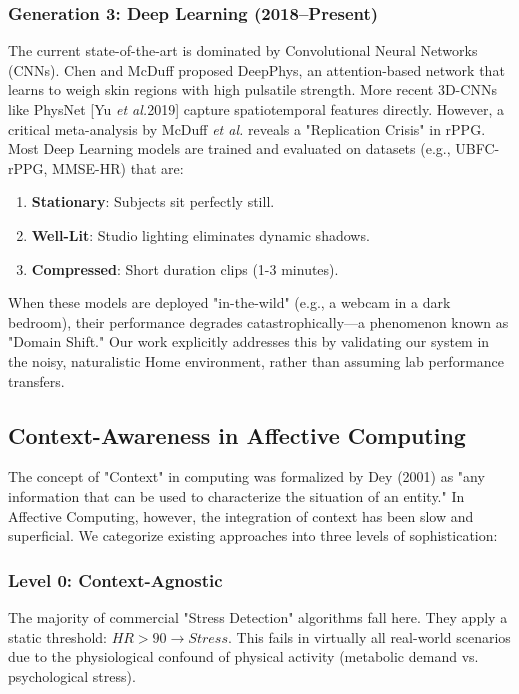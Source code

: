\documentclass[journal]{IEEEtran}
\newcommand{\etal}{\textit{et al.}}
\begin{document}
\subsubsection{Generation 3: Deep Learning (2018--Present)}
The current state-of-the-art is dominated by Convolutional Neural Networks (CNNs). Chen and McDuff \cite{deepphys} proposed DeepPhys, an attention-based network that learns to weigh skin regions with high pulsatile strength. More recent 3D-CNNs like PhysNet [Yu \etal 2019] capture spatiotemporal features directly.
However, a critical meta-analysis by McDuff \etal \cite{mcduff_rppg} reveals a "Replication Crisis" in rPPG. Most Deep Learning models are trained and evaluated on datasets (e.g., UBFC-rPPG, MMSE-HR) that are:
\begin{enumerate}
    \item \textbf{Stationary}: Subjects sit perfectly still.
    \item \textbf{Well-Lit}: Studio lighting eliminates dynamic shadows.
    \item \textbf{Compressed}: Short duration clips (1-3 minutes).
\end{enumerate}
When these models are deployed "in-the-wild" (e.g., a webcam in a dark bedroom), their performance degrades catastrophically—a phenomenon known as "Domain Shift." Our work explicitly addresses this by validating our system in the noisy, naturalistic Home environment, rather than assuming lab performance transfers.

\subsection{Context-Awareness in Affective Computing}
The concept of "Context" in computing was formalized by Dey (2001) as "any information that can be used to characterize the situation of an entity." In Affective Computing, however, the integration of context has been slow and superficial.
We categorize existing approaches into three levels of sophistication:

\subsubsection{Level 0: Context-Agnostic}
The majority of commercial "Stress Detection" algorithms fall here. They apply a static threshold: $HR > 90 \to Stress$. This fails in virtually all real-world scenarios due to the physiological confound of physical activity (metabolic demand vs. psychological stress).
\end{document}

